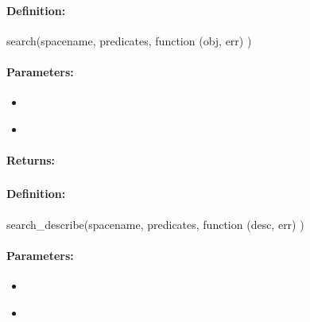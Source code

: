 \paragraph{Definition:}
\begin{javascriptcode}
search(spacename, predicates, function (obj, err) {})
\end{javascriptcode}
\paragraph{Parameters:}
\begin{itemize}[noitemsep]
\item {}\\

\item {}\\

\end{itemize}

\paragraph{Returns:}


\pagebreak
\subsubsection{}
\label{api:nodejs:search_describe}


\paragraph{Definition:}
\begin{javascriptcode}
search_describe(spacename, predicates, function (desc, err) {})
\end{javascriptcode}
\paragraph{Parameters:}
\begin{itemize}[noitemsep]
\item {}\\

\item {}\\

\end{itemize}

